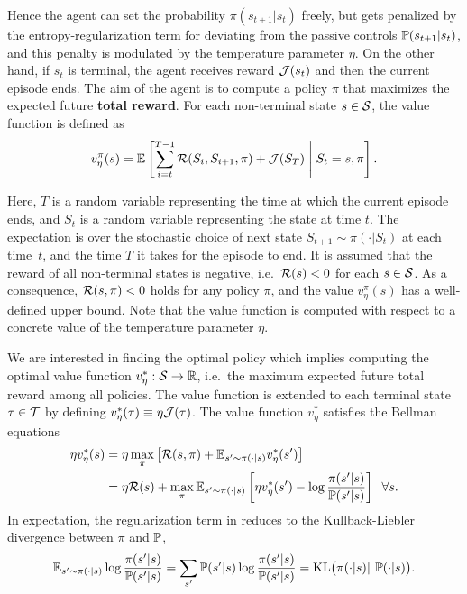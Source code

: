 Hence the agent can set the probability $\pi(s_{t+1}|s_t)$ freely, but gets penalized by the entropy-regularization term for deviating from the passive controls $\mathbb{P}(s_{t+1}|s_t)$, and this penalty is modulated by the temperature parameter $\eta$. On the other hand, if $s_t$ is terminal, the agent receives reward $\mathcal{J}(s_t)$ and then the current episode ends. The aim of the agent is to compute a policy $\pi$ that maximizes the expected future \textbf{total reward}. For each non-terminal state $s\in\mathcal{S}$, the value function is defined as
\[
v^\pi_\eta(s) = \mathbb{E}\left[\sum_{i=t}^{T-1} \mathcal{R}(S_i, S_{i+1},\pi) + \mathcal{J}(S_T)\;\middle\lvert\;S_t = s, \pi\right].
\]

Here, $T$ is a random variable representing the time at which the current episode ends, and $S_t$ is a random variable representing the state at time $t$. The expectation is over the stochastic choice of next state $S_{t+1}\sim\pi(\cdot|S_t)$ at each time~$t$, and the time $T$ it takes for the episode to end. It is assumed that the reward of all non-terminal states is negative, i.e.~$\mathcal{R}(s)<0$ for each $s\in\mathcal{S}$. As a consequence, $\mathcal{R}(s,\pi)<0$ holds for any policy $\pi$, and the value $v^\pi_\eta(s)$ has a well-defined upper bound. Note that the value function is computed with respect to a concrete value of the temperature parameter $\eta$.  


We are interested in finding the optimal policy which implies computing the optimal value function ${v^*_\eta:\mathcal{S}\rightarrow\mathbb{R}}$, i.e.~the maximum expected future total reward among all policies. The value function is extended to each terminal state $\tau\in\mathcal{T}$ by defining $v^*_\eta(\tau)\equiv\eta\mathcal{J}(\tau)$. The value function $v^*_\eta$ satisfies the Bellman equations
\begin{align*}
  \eta v^*_\eta(s) &= \eta \max_\pi \left[ \mathcal{R}(s,\pi) + \mathbb{E}_{s'\sim\pi(\cdot|s)} v^*_\eta(s') \right] \\
  &= \eta \mathcal{R}(s) + \max_\pi \mathbb{E}_{s'\sim\pi(\cdot|s)} \left[ \eta v^*_\eta(s') - \log \frac {\pi(s'|s)} {\mathbb{P}(s'|s)} \right] \;\; \forall s.
\end{align*}
In expectation, the regularization term in reduces to the Kullback-Liebler divergence between $\pi$ and $\mathbb{P}$,
\begin{equation*}
  \mathbb{E}_{s'\sim\pi(\cdot|s)} \log \frac {\pi(s'|s)} {\mathbb{P}(s'|s)} = \sum_{s'}\mathbb{P}(s'\lvert s)\log\frac{\pi(s'\lvert s)}{\mathbb{P}(s'\lvert s)} = \mathrm{KL}\big(\pi(\cdot|s)\Vert\, \mathbb{P}(\cdot|s)\big).
\end{equation*}

